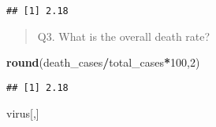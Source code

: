 \documentclass[
]{article}
\newenvironment{Shaded}{\begin{snugshade}}{\end{snugshade}}
\newcommand{\DecValTok}[1]{\textcolor[rgb]{0.00,0.00,0.81}{#1}}
\newcommand{\KeywordTok}[1]{\textcolor[rgb]{0.13,0.29,0.53}{\textbf{#1}}}
\newcommand{\NormalTok}[1]{#1}
\newcommand{\OperatorTok}[1]{\textcolor[rgb]{0.81,0.36,0.00}{\textbf{#1}}}
\begin{document}
\begin{verbatim}
## [1] 2.18
\end{verbatim}

\begin{quote}
Q3. What is the overall death rate?
\end{quote}

\begin{Shaded}
\begin{Highlighting}[]
\KeywordTok{round}\NormalTok{(death_cases}\OperatorTok{/}\NormalTok{total_cases}\OperatorTok{*}\DecValTok{100}\NormalTok{,}\DecValTok{2}\NormalTok{)}
\end{Highlighting}
\end{Shaded}

\begin{verbatim}
## [1] 2.18
\end{verbatim}

\begin{Shaded}
\begin{Highlighting}[]
\NormalTok{virus[,]}
\end{Highlighting}
\end{Shaded}
\end{document}
